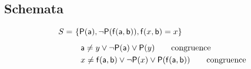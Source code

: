 \subsection{Schemata}

\begin{frame}
%		
		\begin{example}
			\vspace{-1em}
			\begin{align*}
			S =&\ \{ {\mathsf P}({\mathsf a}), \lnot{\mathsf P}({\mathsf f}({\mathsf a},{\mathsf b})), {\mathsf f}(x,{\mathsf b})= x \} 
			\\[0.5em]
&\quad {\mathsf a}\neq y \lor \lnot {\mathsf P}({\mathsf a}) \lor {\mathsf P}(y) \tag*{congruence}\\
&\quad x\neq {\mathsf f}({\mathsf a},{\mathsf b}) \lor \lnot {\mathsf P}(x) \lor {\mathsf P}({\mathsf f}({\mathsf a},{\mathsf b})) \tag*{congruence}
\end{align*}
			\end{example}
			
			\end{frame}